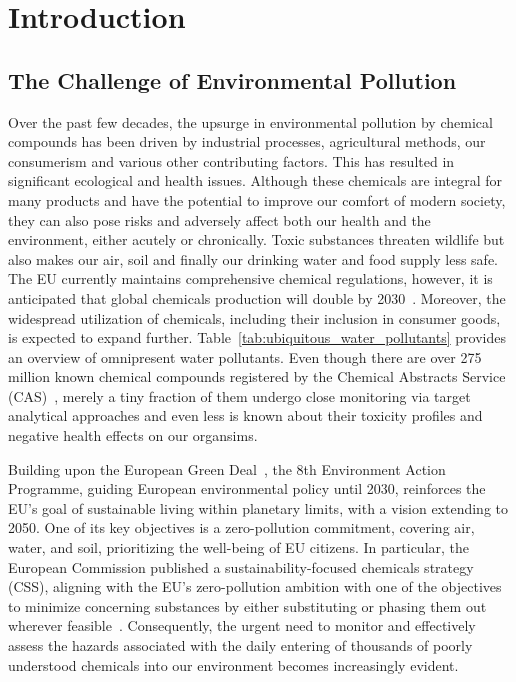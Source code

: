 \newcommand{\package}{\emph}

\chapter{Introduction}\label{chap:introduction}

\section{The Challenge of Environmental Pollution}

Over the past few decades, the upsurge in environmental pollution by chemical compounds has been driven by industrial processes, agricultural methods, our consumerism and various other contributing factors. This has resulted in significant ecological and health issues. Although these chemicals are integral for many products and have the potential to improve our comfort of modern society, they can also pose risks and adversely affect both our health and the environment, either acutely or chronically. Toxic substances threaten wildlife but also makes our air, soil and finally our drinking water and food supply less safe. The EU currently maintains comprehensive chemical regulations, however, it is anticipated that global chemicals production will double by 2030~\cite{chemicaloutlook}. Moreover, the widespread utilization of chemicals, including their inclusion in consumer goods, is expected to expand further. Table~\ref{tab:ubiquitous_water_pollutants} provides an overview of omnipresent water pollutants.
Even though there are over 275 million known chemical compounds registered by the Chemical Abstracts Service (CAS)~\cite{CAS}, merely a tiny fraction of them undergo close monitoring via target analytical approaches and even less is known about their toxicity profiles and negative health effects on our organsims.

Building upon the European Green Deal~\cite{greendeal}, the 8th Environment Action Programme, guiding European environmental policy until 2030, reinforces the EU's goal of sustainable living within planetary limits, with a vision extending to 2050. One of its key objectives is a zero-pollution commitment, covering air, water, and soil, prioritizing the well-being of EU citizens. In particular, the European Commission published a sustainability-focused chemicals strategy (CSS), aligning with the EU's zero-pollution ambition with one of the objectives to minimize concerning substances by either substituting or phasing them out wherever feasible~\cite{EUChemicalsStrategy}. 
Consequently, the urgent need to monitor and effectively assess the hazards associated with the daily entering of thousands of poorly understood chemicals into our environment becomes increasingly evident.


